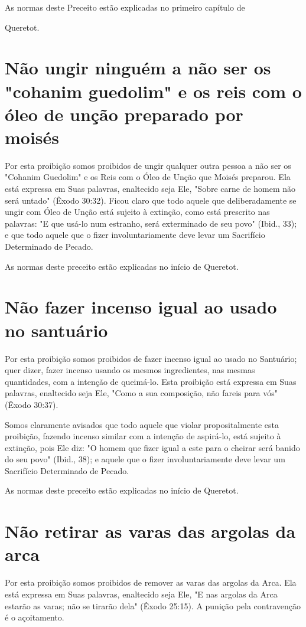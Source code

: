 \begin{itemize}
\begin{enumrate}
\begin{itemize}
\begin{itemize}
\begin{itemize}
As normas deste Preceito estão explicadas no primeiro capítulo de


Queretot.


\section{Não ungir ninguém a não ser os "cohanim guedolim" e os reis 
com o óleo de unção preparado por moisés}

Por esta proibição somos proibidos de ungir qualquer outra pessoa a não
ser os "Cohanim Guedolim" e os Reis com o Óleo de Unção que Moisés
preparou. Ela está expressa em Suas palavras, enaltecido seja Ele,
"Sobre carne de homem não será untado" (Êxodo 30:32). Ficou claro que
todo aquele que deliberadamente se ungir com Óleo de Unção está sujeito
à extinção, como es­tá prescrito nas palavras: "E que usá-lo num
estranho, será exterminado de seu povo" (Ibid., 33); e que todo aquele
que o fizer involuntariamente deve levar um Sacrifício Determinado de
Pecado.


As normas deste preceito estão explicadas no início de Queretot.


\section{Não fazer incenso igual ao usado no santuário}

Por esta proibição somos proibidos de fazer incenso igual ao usado no
Santuário; quer dizer, fazer incenso usando os mesmos ingredientes, nas
mes­mas quantidades, com a intenção de queimá-lo. Esta proibição está
expressa em Suas palavras, enaltecido seja Ele, "Como a sua composição,
não fareis para vós" (Êxodo 30:37).

Somos claramente avisados que todo aquele que violar proposital­mente
esta proibição, fazendo incenso similar com a intenção de aspirá-lo,
está sujeito à extinção, pois Ele diz: "O homem que fizer igual a este
para o cheirar será banido do seu povo" (Ibid., 38); e aquele que o
fizer involuntariamente deve levar um Sacrifício Determinado de Pecado.


As normas deste preceito estão explicadas no início de Queretot.


\section{Não retirar as varas das argolas da arca}

Por esta proibição somos proibidos de remover as varas das argolas da
Arca. Ela está expressa em Suas palavras, enaltecido seja Ele, "E nas
argolas da Arca estarão as varas; não se tirarão dela" (Êxodo 25:15). A
punição pela con­travenção é o açoitamento.


\end{itemize}
\end{itemize}
\end{itemize}
\end{enumrate}
\end{itemize}

